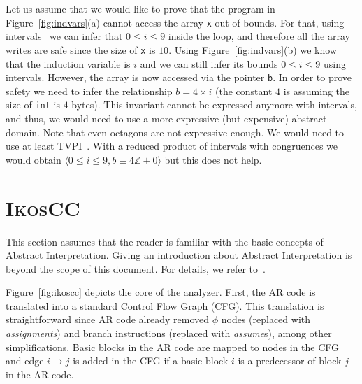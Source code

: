 \documentclass[a4]{article}
\newcommand{\ikoscc}{\textsc{IkosCC}\xspace}
\begin{document}
{Let us assume that we would like to prove that the program in
Figure~\ref{fig:indvars}(a) cannot access the array \texttt{x} out of
bounds. For that, using intervals~\cite{intervals} we can infer that
$0 \leq i \leq 9$ inside the loop, and therefore all the array writes
are safe since the size of \texttt{x} is $10$. Using
Figure~\ref{fig:indvars}(b) we know that the induction variable is $i$
and we can still infer its bounds $0 \leq i \leq 9$ using
intervals. However, the array is now accessed via the pointer
\texttt{b}. In order to prove safety we need to infer the relationship
$b = 4 \times i$ (the constant $4$ is assuming the size of
\texttt{int} is $4$ bytes). This invariant cannot be expressed anymore
with intervals, and thus, we would need to use a more expressive (but
expensive) abstract domain. Note that even octagons are not expressive
enough. We would need to use at least TVPI~\cite{SimonK10}. With a
reduced product of intervals with congruences we would obtain $\langle
0 \leq i \leq 9, b \equiv 4\mathbb{Z} + 0\rangle$ but this does not
help.
}







\section{\ikoscc}
\label{sec:analysis}

This section assumes that the reader is familiar with the basic
concepts of Abstract Interpretation. Giving an introduction about
Abstract Interpretation is beyond the scope of this document. For
details, we refer to~\cite{Cousot_POPL77,CousotC79,NNH}.

Figure~\ref{fig:ikoscc} depicts the core of the analyzer.  First, the
AR code is translated into a standard Control Flow Graph (CFG). This
translation is straightforward since AR code already removed $\phi$
nodes (replaced with \emph{assignments}) and branch instructions
(replaced with \emph{assume}s), among other simplifications. Basic
blocks in the AR code are mapped to nodes in the CFG and edge $i
\rightarrow j$ is added in the CFG if a basic block $i$ is a
predecessor of block $j$ in the AR code.
\end{document}
